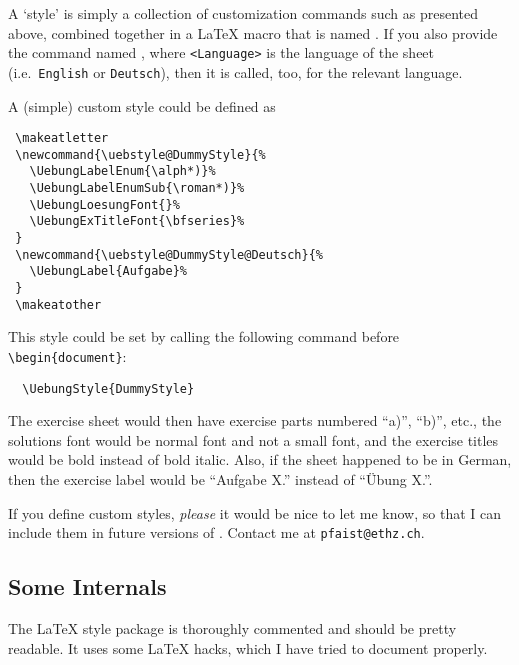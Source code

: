 \documentclass[11pt,a4paper]{article}
\begin{document}
A `style' is simply a collection of customization commands such as presented above,
combined together in a \LaTeX{} macro that is named
. If you also provide the command named
, where \texttt{<Language>} is the
language of the sheet (i.e.\ \texttt{English} or \texttt{Deutsch}), then it is called,
too, for the relevant language.

A (simple) custom style could be defined as
\begin{pkgverbatim}
\begin{verbatim}
 \makeatletter
 \newcommand{\uebstyle@DummyStyle}{%
   \UebungLabelEnum{\alph*)}%
   \UebungLabelEnumSub{\roman*)}%
   \UebungLoesungFont{}%
   \UebungExTitleFont{\bfseries}%
 }
 \newcommand{\uebstyle@DummyStyle@Deutsch}{%
   \UebungLabel{Aufgabe}%
 }
 \makeatother
\end{verbatim}
\end{pkgverbatim}

This style could be set by calling the following command before \verb|\begin{document}|:
\begin{pkgverbatim}
\begin{verbatim}
  \UebungStyle{DummyStyle}
\end{verbatim}
\end{pkgverbatim}

The exercise sheet would then have exercise parts numbered ``a)'', ``b)'', etc., the
solutions font would be normal font and not a small font, and the exercise titles would be
bold instead of bold italic. Also, if the sheet happened to be in German, then the
exercise label would be ``Aufgabe X.'' instead of ``\"Ubung X.''.

\begin{pkgnotice}
  If you define custom styles, \emph{please} it would be nice to let me know, so that I
  can include them in future versions of \ethuebung{}. Contact me at
  \texttt{pfaist{@}ethz.ch}.
\end{pkgnotice}






\subsection{Some Internals}
\label{sec:Internals}

The \LaTeX{} style package is thoroughly commented and should be pretty readable. It uses
some \LaTeX{} hacks, which I have tried to document properly.
\end{document}

